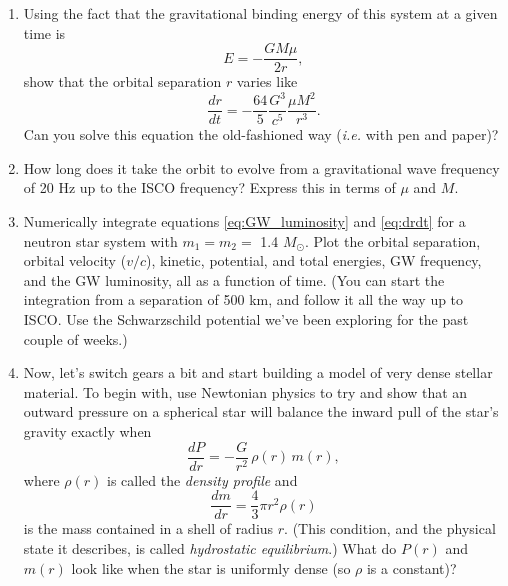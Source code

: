 \documentclass[11pt]{article}
\begin{document}
\vspace{1000pt}

\begin{enumerate}

\item Using the fact that the gravitational binding energy of this system at a given time is
\[ E = - \frac{GM\mu}{2r}, \]
show that the orbital separation $r$ varies like
\begin{equation}\label{eq:drdt}
\frac{dr}{dt} = - \frac{64}{5} \frac{G^3}{c^5} \frac{\mu M^2}{r^3}.
\end{equation}
Can you solve this equation the old-fashioned way (\textit{i.e.} with pen and paper)?

\item How long does it take the orbit to evolve from a gravitational wave frequency of 20 Hz up to the ISCO frequency? Express this in terms of $\mu$ and $M$.

\item Numerically integrate equations \ref{eq:GW_luminosity} and \ref{eq:drdt} for a neutron star system with $m_1 = m_2 =$ 1.4 $M_{\odot}$. Plot the orbital separation, orbital velocity ($v/c$), kinetic, potential, and total energies, GW frequency, and the GW luminosity, all as a function of time. (You can start the integration from a separation of 500 km, and follow it all the way up to ISCO. Use the Schwarzschild potential we've been exploring for the past couple of weeks.)

\item Now, let's switch gears a bit and start building a model of very dense stellar material. To begin with, use Newtonian physics to try and show that an outward pressure on a spherical star will balance the inward pull of the star's gravity exactly when
\begin{equation}\label{eq:hydro}
\frac{dP}{dr} = - \frac{G}{r^2}\, \rho(r)\, m(r),
\end{equation}
where $\rho(r)$ is called the \textit{density profile} and
\[ \frac{dm}{dr} = \frac{4}{3}\pi r^2 \rho(r) \]
is the mass contained in a shell of radius $r$. (This condition, and the physical state it describes, is called \textit{hydrostatic equilibrium}.) What do $P(r)$ and $m(r)$ look like when the star is uniformly dense (so $\rho$ is a constant)?


\end{enumerate}
\end{document}
